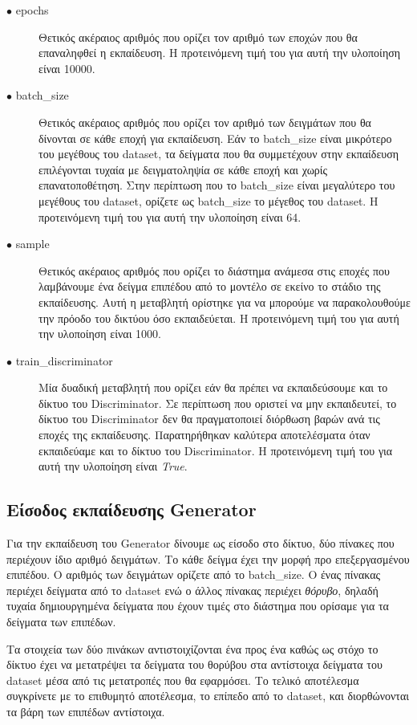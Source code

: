 \begin{description}
\item[$\bullet$ epochs] Θετικός ακέραιος αριθμός που ορίζει τον αριθμό των εποχών που θα επαναληφθεί η εκπαίδευση. Η προτεινόμενη τιμή του για αυτή την υλοποίηση είναι 10000.
\item[$\bullet$ batch\_size] Θετικός ακέραιος αριθμός που ορίζει τον αριθμό των δειγμάτων που θα δίνονται σε κάθε εποχή για εκπαίδευση. Εάν το batch\_size είναι μικρότερο του μεγέθους του dataset, τα δείγματα που θα συμμετέχουν στην εκπαίδευση επιλέγονται τυχαία με δειγματοληψία σε κάθε εποχή και χωρίς επανατοποθέτηση. Στην περίπτωση που το batch\_size είναι μεγαλύτερο του μεγέθους του dataset, ορίζετε ως batch\_size το μέγεθος του dataset. Η προτεινόμενη τιμή του για αυτή την υλοποίηση είναι 64.
\item[$\bullet$ sample] Θετικός ακέραιος αριθμός που ορίζει το διάστημα ανάμεσα στις εποχές που λαμβάνουμε ένα δείγμα επιπέδου από το μοντέλο σε εκείνο το στάδιο της εκπαίδευσης. Αυτή η μεταβλητή ορίστηκε για να μπορούμε να παρακολουθούμε την πρόοδο του δικτύου όσο εκπαιδεύεται. Η προτεινόμενη τιμή του για αυτή την υλοποίηση είναι 1000.
\item[$\bullet$ train\_discriminator] Μία δυαδική μεταβλητή που ορίζει εάν θα πρέπει να εκπαιδεύσουμε και το δίκτυο του Discriminator. Σε περίπτωση που οριστεί να μην εκπαιδευτεί, το δίκτυο του Discriminator δεν θα πραγματοποιεί διόρθωση βαρών ανά τις εποχές της εκπαίδευσης. Παρατηρήθηκαν καλύτερα αποτελέσματα όταν εκπαιδεύαμε και το δίκτυο του Discriminator. Η προτεινόμενη τιμή του για αυτή την υλοποίηση είναι \textit{True}.
\end{description}

\subsection{Είσοδος εκπαίδευσης Generator}
Για την εκπαίδευση του Generator δίνουμε ως είσοδο στο δίκτυο, δύο πίνακες που περιέχουν ίδιο αριθμό δειγμάτων. Το κάθε δείγμα έχει την μορφή προ επεξεργασμένου επιπέδου. Ο αριθμός των δειγμάτων ορίζετε από το batch\_size. O ένας πίνακας περιέχει δείγματα από το dataset ενώ ο άλλος πίνακας περιέχει \textit{θόρυβο}, δηλαδή τυχαία δημιουργημένα δείγματα που έχουν τιμές στο διάστημα που ορίσαμε για τα δείγματα των επιπέδων. 
\par
Τα στοιχεία των δύο πινάκων αντιστοιχίζονται ένα προς ένα καθώς ως στόχο το δίκτυο έχει να μετατρέψει τα δείγματα του θορύβου στα αντίστοιχα δείγματα του dataset μέσα από τις μετατροπές που θα εφαρμόσει. Το τελικό αποτέλεσμα συγκρίνετε με το επιθυμητό αποτέλεσμα, το επίπεδο από το dataset, και διορθώνονται τα βάρη των επιπέδων αντίστοιχα.

